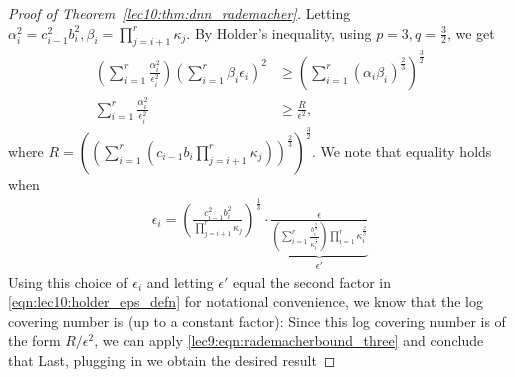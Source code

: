 \begin{proof}[Proof of Theorem~\ref{lec10:thm:dnn_rademacher}]
Letting $\alpha_i^2 = c_{i-1}^2b_i^2, \beta_i = \prod_{j=i+1}^{r}\kappa_j$. By Holder's inequality, using $p = 3, q = \frac{3}{2}$, we get
\begin{align}
    \left(\sum_{i=1}^{r}\frac{\alpha_i^2}{\epsilon_i^2}\right)\left(\sum_{i=1}^{r}\beta_i\epsilon_i\right)^2 &\geq \left(\sum_{i=1}^{r}\left(\alpha_i\beta_i\right)^{\frac{2}{3}}\right)^{\frac{3}{2}} \\
    \sum_{i=1}^{r}\frac{\alpha_i^2}{\epsilon_i^2} &\geq \frac{R}{\epsilon^2},
\end{align}
where $R = \left(\left(\sum_{i=1}^{r}\left(c_{i-1}b_i\prod_{j=i+1}^{r}\kappa_j\right)\right)^{\frac{2}{3}}\right)^{\frac{3}{2}}$. We note that equality holds when 
\begin{align}
    \epsilon_i = \left(\frac{c_{i-1}^2b_i^2}{\prod_{j=i+1}^{r}\kappa_j}\right)^{\frac{1}{3}} \cdot \underbrace{\frac{\epsilon}{\left(\sum_{i=1}^{r}\frac{b_i^{\frac{2}{3}}}{\kappa_i^{\frac{2}{3}}}\right)\prod_{i=1}^{r}\kappa_i^{\frac{2}{3}} }}_{\epsilon'} \label{eqn:lec10:holder_eps_defn}
\end{align}
Using this choice of $\epsilon_i$ and letting $\epsilon'$ equal the second factor in \eqref{eqn:lec10:holder_eps_defn} for notational convenience, we know that the log covering number is (up to a constant factor):
Since this log covering number is of the form $R / \epsilon^2$, we can apply \eqref{lec9:eqn:rademacherbound_three} and conclude that
Last, plugging in
we obtain the desired result

\end{proof}

